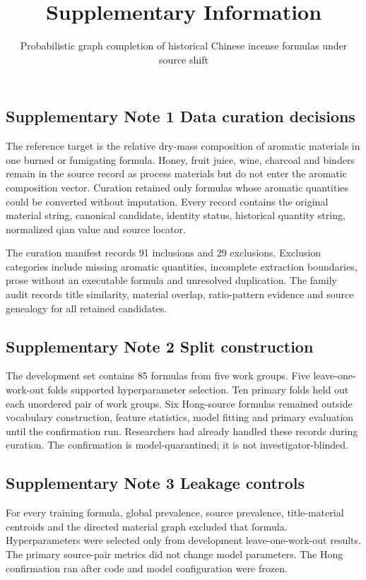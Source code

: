 \documentclass[11pt]{article}
\title{Supplementary Information}
\author{\parbox{0.82\textwidth}{\centering Probabilistic graph completion of historical Chinese incense formulas under source shift}}
\date{}
\begin{document}
\maketitle

\renewcommand{\theequation}{S\arabic{equation}}

\subsection{Supplementary Note 1 Data curation decisions}

The reference target is the relative dry-mass composition of aromatic materials in one burned or fumigating formula. Honey, fruit juice, wine, charcoal and binders remain in the source record as process materials but do not enter the aromatic composition vector. Curation retained only formulas whose aromatic quantities could be converted without imputation. Every record contains the original material string, canonical candidate, identity status, historical quantity string, normalized qian value and source locator.

The curation manifest records 91 inclusions and 29 exclusions. Exclusion categories include missing aromatic quantities, incomplete extraction boundaries, prose without an executable formula and unresolved duplication. The family audit records title similarity, material overlap, ratio-pattern evidence and source genealogy for all retained candidates.

\subsection{Supplementary Note 2 Split construction}

The development set contains 85 formulas from five work groups. Five leave-one-work-out folds supported hyperparameter selection. Ten primary folds held out each unordered pair of work groups. Six Hong-source formulas remained outside vocabulary construction, feature statistics, model fitting and primary evaluation until the confirmation run. Researchers had already handled these records during curation. The confirmation is model-quarantined; it is not investigator-blinded.

\subsection{Supplementary Note 3 Leakage controls}

For every training formula, global prevalence, source prevalence, title-material centroids and the directed material graph excluded that formula. Hyperparameters were selected only from development leave-one-work-out results. The primary source-pair metrics did not change model parameters. The Hong confirmation ran after code and model configuration were frozen.
\end{document}
